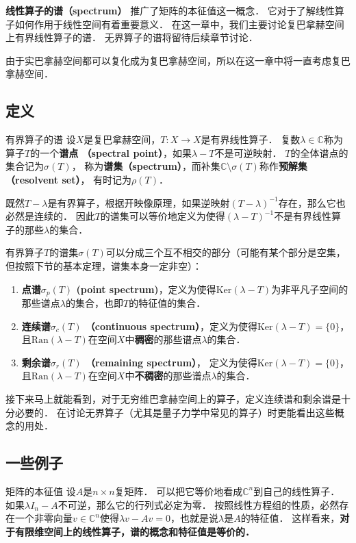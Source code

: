 
\textbf{线性算子的谱（spectrum）} 推广了矩阵的本征值这一概念． 它对于了解线性算子如何作用于线性空间有着重要意义． 在这一章中，我们主要讨论复巴拿赫空间上有界线性算子的谱． 无界算子的谱将留待后续章节讨论．

由于实巴拿赫空间都可以复化成为复巴拿赫空间，所以在这一章中将一直考虑复巴拿赫空间．

\subsection{定义}
\begin{definition}{有界算子的谱}
设$X$是复巴拿赫空间，$T:X\to X$是有界线性算子． 复数$\lambda\in\mathbb{C}$称为算子$T$的一个\textbf{谱点 （spectral point）}，如果$\lambda-T$不是可逆映射． $T$的全体谱点的集合记为$\sigma(T)$， 称为\textbf{谱集（spectrum）}，而补集$\mathbb{C}\setminus\sigma(T)$称作\textbf{预解集（resolvent set）}， 有时记为$\rho(T)$．
\end{definition}

既然$T-\lambda$是有界算子，根据开映像原理，如果逆映射$(T-\lambda)^{-1}$存在，那么它也必然是连续的． 因此$T$的谱集可以等价地定义为使得$(\lambda-T)^{-1}$不是有界线性算子的那些$\lambda$的集合．

有界算子$T$的谱集$\sigma(T)$可以分成三个互不相交的部分（可能有某个部分是空集，但按照下节的基本定理，谱集本身一定非空）：

\begin{enumerate}
\item \textbf{点谱$\sigma_p(T)$ (point spectrum)}，定义为使得$\text{Ker}(\lambda-T)$为非平凡子空间的那些谱点$\lambda$的集合，也即$T$的特征值的集合．

\item \textbf{连续谱$\sigma_c(T)$ （continuous spectrum）}，定义为使得$\text{Ker}(\lambda-T)=\{0\}$，且$\text{Ran}(\lambda-T)$在空间$X$中\textbf{稠密}的那些谱点$\lambda$的集合．

\item \textbf{剩余谱$\sigma_r(T)$ （remaining spectrum）}， 定义为使得$\text{Ker}(\lambda-T)=\{0\}$，且$\text{Ran}(\lambda-T)$在空间$X$中\textbf{不稠密}的那些谱点$\lambda$的集合．
\end{enumerate}

接下来马上就能看到，对于无穷维巴拿赫空间上的算子，定义连续谱和剩余谱是十分必要的． 在讨论无界算子（尤其是量子力学中常见的算子）时更能看出这些概念的用处．

\subsection{一些例子}
\begin{example}{矩阵的本征值}
设$A$是$n\times n$复矩阵． 可以把它等价地看成$\mathbb{C}^n$到自己的线性算子． 如果$\lambda I_n-A$不可逆，那么它的行列式必定为零． 按照线性方程组的性质，必然存在一个非零向量$v\in \mathbb{C}^n$使得$\lambda v-Av=0$，也就是说$\lambda$是$A$的特征值． 这样看来，\textbf{对于有限维空间上的线性算子，谱的概念和特征值是等价的．}
\end{example}

